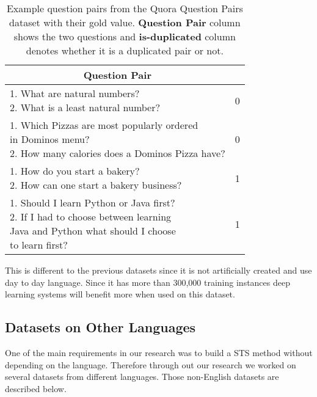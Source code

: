 \begin{enumerate}
    \begin{table}[ht!]
 	\centering 	
 	\begin{tabular}{l|c} 
 		\hline
 		\multicolumn{1}{c|}{\textbf{Question Pair}} & 
 		\multicolumn{1}{c}{\textbf{\detokenize{is-duplicate}}}  \\
 		\hline
 		\makecell[l]
 		{	1. What are natural numbers? \\ 
 			2. What is a least natural number?} & 0  \\
 		\hline
 		\makecell[l]
 		{	1. Which Pizzas are most popularly ordered \\ in Dominos menu? \\ 
 			2. How many calories does a Dominos Pizza have?} & 0  \\
 		\hline
 		\makecell[l]
 		{   1. How do you start a bakery? \\ 
 			2. How can one start a bakery business?} & 1  \\
 		\hline
 		\makecell[l]
 		{	1. Should I learn Python or Java first? \\ 
 			2. If I had to choose between learning \\ Java and Python what should I choose \\ to learn first?} & 1  \\
 		\hline
 		
 	\end{tabular}
 	\caption[Example question pairs from the Quora Question Pairs dataset]{Example question  pairs from the Quora Question Pairs dataset with their gold  value. \textbf{Question Pair} column shows the two questions and \textbf{is-duplicated} column denotes whether it is a duplicated pair or not.}
 	\label{tab:quoradata}
 \end{table}  
 
  
This is different to the previous datasets since it is not artificially created and use day to day language. Since it has more than 300,000 training instances deep learning systems will benefit more when used on this dataset. 
\end{enumerate}

\subsection{Datasets on Other Languages}
One of the main requirements in our research was to build a STS method without depending on the language. Therefore through out our research we worked on several datasets from different languages. Those non-English datasets are described below. 
  
